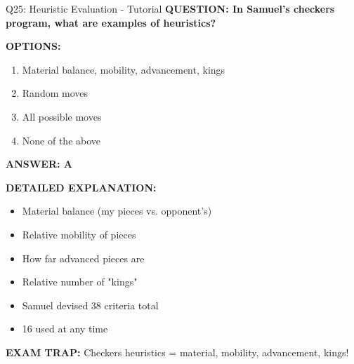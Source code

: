 \documentclass[8pt]{beamer}
\begin{document}
	\begin{frame}{Q25: Heuristic Evaluation - Tutorial}
		\fontsize{6.5}{7.5}\selectfont
		\textbf{QUESTION: In Samuel's checkers program, what are examples of heuristics?}
		
		\vspace{0.1cm}
		\textbf{OPTIONS:}
		\begin{enumerate}
			\item Material balance, mobility, advancement, kings
			\item Random moves
			\item All possible moves
			\item None of the above
		\end{enumerate}
		
		\vspace{0.1cm}
		\textcolor{myblue}{\textbf{ANSWER: A}}
		
		\vspace{0.1cm}
		\textbf{DETAILED EXPLANATION:}
		\begin{itemize}
			\item Material balance (my pieces vs. opponent's)
			\item Relative mobility of pieces
			\item How far advanced pieces are
			\item Relative number of "kings"
			\item Samuel devised 38 criteria total
			\item 16 used at any time
		\end{itemize}
		
		\vspace{0.1cm}
		\textcolor{myred}{\textbf{EXAM TRAP:}} Checkers heuristics = \textcolor{myblue}{material, mobility, advancement, kings}!
	\end{frame}
	
	
\end{document}
